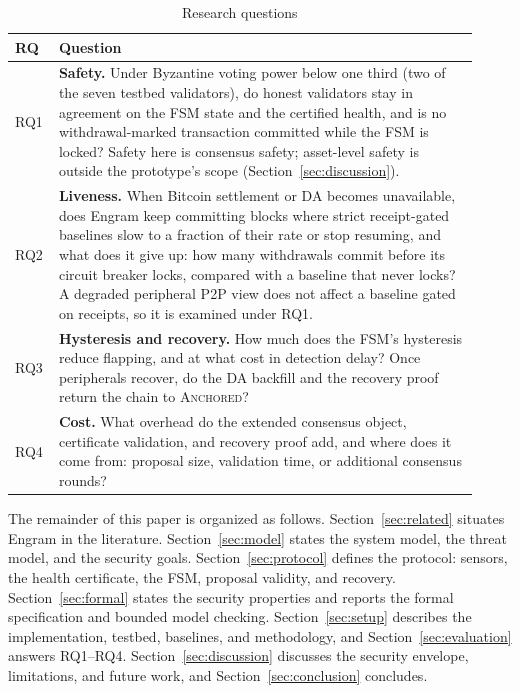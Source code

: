 \begin{table}[tbp]
\caption{Research questions}
\label{tab:rq}
\centering
\small
\begin{tabular}{@{}p{0.07\linewidth}p{0.85\linewidth}@{}}
\toprule
\textbf{RQ} & \textbf{Question} \\
\midrule
RQ1 & \textbf{Safety.} Under Byzantine voting power below one third (two of the seven testbed validators), do honest
validators stay in agreement on the FSM state and the certified health, and is no
withdrawal-marked transaction committed while the FSM is locked? Safety here is consensus safety; asset-level safety is outside the prototype's scope (Section~\ref{sec:discussion}). \\
RQ2 & \textbf{Liveness.} When Bitcoin settlement or DA becomes unavailable,
does Engram keep committing blocks where strict receipt-gated baselines slow to a fraction of their rate or stop resuming,
and what does it give up: how many withdrawals commit before its circuit
breaker locks, compared with a baseline that never locks? A degraded
peripheral P2P view does not affect a baseline gated on receipts, so it is
examined under RQ1. \\
RQ3 & \textbf{Hysteresis and recovery.} How much does the FSM's hysteresis reduce
flapping, and at what cost in detection delay? Once peripherals recover, do the
DA backfill and the recovery proof return the chain to \textsc{Anchored}? \\
RQ4 & \textbf{Cost.} What overhead do the extended consensus object,
certificate validation, and recovery proof add, and where does it come
from: proposal size, validation time, or additional consensus rounds? \\
\bottomrule
\end{tabular}
\end{table}

The remainder of this paper is organized as follows. Section~\ref{sec:related}
situates Engram in the literature. Section~\ref{sec:model} states the system
model, the threat model, and the security goals. Section~\ref{sec:protocol}
defines the protocol: sensors, the health certificate, the FSM, proposal
validity, and recovery. Section~\ref{sec:formal} states the security properties
and reports the formal specification and bounded model checking.
Section~\ref{sec:setup} describes the implementation, testbed, baselines, and
methodology, and Section~\ref{sec:evaluation} answers RQ1--RQ4.
Section~\ref{sec:discussion} discusses the security envelope, limitations, and
future work, and Section~\ref{sec:conclusion} concludes.
